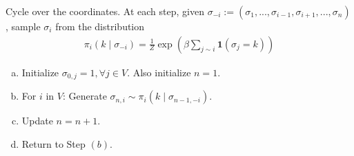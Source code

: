 \documentclass[11pt]{elegantbook}
\begin{document}
Cycle over the coordinates. At each step, given $\sigma_{-i} := (\sigma_1,...,\sigma_{i-1},\sigma_{i+1},...,\sigma_n)$, sample $\sigma_i$ from the distribution
\begin{equation}
    \begin{aligned}
        \pi_i(k\mid\sigma_{-i})=\frac{1}{Z} \exp \left(\beta \sum_{j \sim i} \mathbf{1}\left(\sigma_j=k\right)\right)
    \end{aligned}
    \nonumber
\end{equation}
\begin{enumerate}[(a)]
    \item Initialize $\sigma_{0,j}=1,\forall j\in V$. Also initialize $n=1$.
    \item For $i$ in $V$: Generate $\sigma_{n,i} \sim \pi_i(k\mid\sigma_{n-1,-i})$.
    \item Update $n=n+1$.
    \item Return to Step $(b)$.
\end{enumerate}
\end{document}

